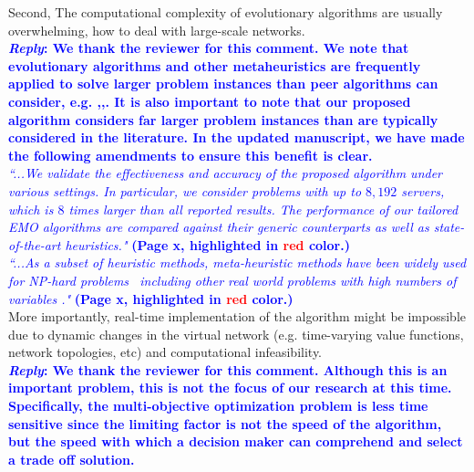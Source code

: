 \begin{enumerate}
            \textsf{Second, The computational complexity of evolutionary algorithms are usually overwhelming, how to deal with large-scale networks.}\\
            \textcolor{blue}{\textbf{\textit{Reply}: We thank the reviewer for this comment. We note that evolutionary algorithms and other metaheuristics are frequently applied to solve larger problem instances than peer algorithms can consider, e.g. \cite{JiaMZ21},\cite{PengJW19},\cite{ChengJ15}. It is also important to note that our proposed algorithm considers far larger problem instances than are typically considered in the literature. In the updated manuscript, we have made the following amendments to ensure this benefit is clear.}}\\
            \textcolor{blue}{\textit{``...We validate the effectiveness and accuracy of the proposed algorithm under various settings. In particular, we consider problems with up to $8,192$ servers, which is $8$ times larger than all reported results. The performance of our tailored EMO algorithms are compared against their generic counterparts as well as state-of-the-art heuristics."} \textbf{(Page x, highlighted in \textcolor{red}{red} color.)}}\\
            \textcolor{blue}{\textit{``...As a subset of heuristic methods, meta-heuristic methods have been widely used for NP-hard problems~\cite{TODO,TODO,TODO,TODO,TODO} including other real world problems with high numbers of variables \cite{TODO,TODO,TODO}."} \textbf{(Page x, highlighted in \textcolor{red}{red} color.)}}\\

            \textsf{More importantly, real-time implementation of the algorithm might be impossible due to dynamic changes in the virtual network (e.g. time-varying value functions, network topologies, etc) and computational infeasibility.}\\
            \textcolor{blue}{\textbf{\textit{Reply}: We thank the reviewer for this comment. Although this is an important problem, this is not the focus of our research at this time. Specifically, the multi-objective optimization problem is less time sensitive since the limiting factor is not the speed of the algorithm, but the speed with which a decision maker can comprehend and select a trade off solution.}}\\
\end{enumerate}

\clearpage
